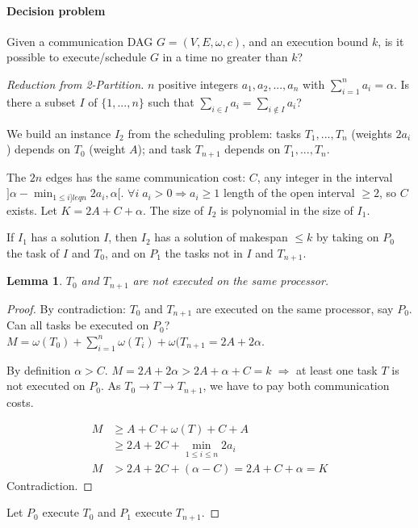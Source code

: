 \documentclass{article}
\newtheorem{lemma}{Lemma}
\begin{document}
\paragraph{Decision problem}
Given a communication DAG $G=(V,E,\omega,c)$, and an execution bound $k$, is it possible to execute/schedule $G$ in a time no greater than $k$?

\begin{proof}[Reduction from 2-Partition]
$n$ positive integers $a_1,a_2,...,a_n$ with $\sum_{i=1}^n a_i = \alpha$. Is there a subset $I$ of $\{1,...,n\}$ such that $\sum_{i\in I} a_i = \sum_{i \notin I} a_i$?

We build an instance $I_2$ from the scheduling problem: tasks $T_1,...,T_n$ (weights $2a_i$) depends on $T_0$ (weight $A$); and task $T_{n+1}$ depends on $T_1,...,T_n$.

The $2n$ edges has the same communication cost: $C$, any integer in the interval $]\alpha - \min_{1\leq i ]leq n} 2a_i, \alpha[$. $\forall i \; a_i>0 \Rightarrow a_i \geq 1$ length of the open interval $\geq 2$, so $C$ exists. Let $K=2A+C+\alpha$. The size of $I_2$ is polynomial in the size of $I_1$.

If $I_1$ has a solution $I$, then $I_2$ has a solution of makespan $\leq k$ by taking on $P_0$ the task of $I$ and $T_0$, and on $P_1$ the tasks not in $I$ and $T_{n+1}$.

\begin{lemma}
$T_0$ and $T_{n+1}$ are not executed on the same processor.
\end{lemma}

\begin{proof}
By contradiction: $T_0$ and $T_{n+1}$ are executed on the same processor, say $P_0$. Can all tasks be executed on $P_0$? $M=\omega(T_0)+\sum_{i=1}^n \omega(T_i) + \omega(T_{n+1}=2A+2\alpha$.

By definition $\alpha > C$. $M=2A+2\alpha> 2A+\alpha+C=k \; \Rightarrow$ at least one task $T$ is not executed on $P_0$. As $T_0 \to T \to T_{n+1}$, we have to pay both communication costs.


\begin{align*}
M & \geq A + C + \omega(T) + C + A\\
& \geq 2A + 2C + \min_{1\leq i\leq n}2a_i\\
M & > 2A + 2C+(\alpha-C)=2A+C+\alpha=K
\end{align*}
Contradiction.
\end{proof}

Let $P_0$ execute $T_0$ and $P_1$ execute $T_{n+1}$.


\end{proof}
\end{document}
